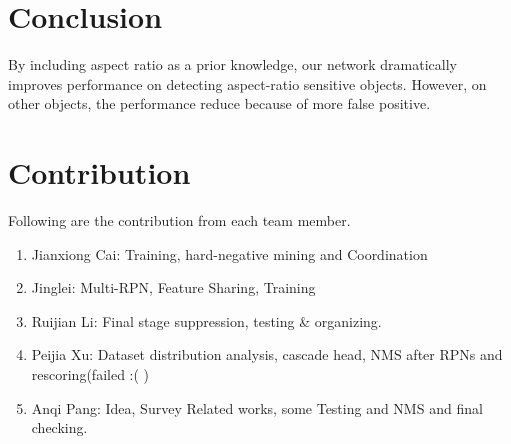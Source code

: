 \documentclass[10pt,twocolumn,letterpaper]{article}
\begin{document}
\section{Conclusion}
By including aspect ratio as a prior knowledge, our network dramatically improves performance on detecting aspect-ratio sensitive objects. However, on other objects, the performance reduce because of more false positive.

\section{Contribution}
Following are the contribution from each team member.
\begin{enumerate}
\item Jianxiong Cai: Training, hard-negative mining and Coordination
\item Jinglei: Multi-RPN, Feature Sharing, Training
\item Ruijian Li: Final stage suppression, testing \& organizing.
\item Peijia Xu: Dataset distribution analysis, cascade head, NMS after RPNs and rescoring(failed :( )
\item Anqi Pang: Idea, Survey Related works, some Testing and NMS and final checking.
\end{enumerate}
\end{document}
